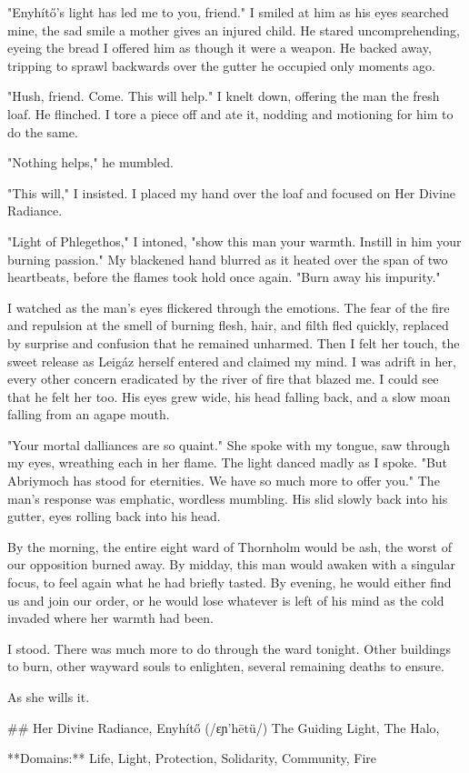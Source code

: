 "Enyhítő's light has led me to you, friend."
 I smiled at him as his eyes searched mine, the sad smile a mother gives an injured child.
 He stared uncomprehending, eyeing the bread I offered him as though it were a weapon.
 He backed away, tripping to sprawl backwards over the gutter he occupied only moments ago.

"Hush, friend.
 Come.
 This will help."
 I knelt down, offering the man the fresh loaf.
 He flinched.
 I tore a piece off and ate it, nodding and motioning for him to do the same.

"Nothing helps," he mumbled.

"This will," I insisted.
 I placed my hand over the loaf and focused on Her Divine Radiance.



"Light of Phlegethos," I intoned, "show this man your warmth.
 Instill in him your burning passion."
 My blackened hand blurred as it heated over the span of two heartbeats,
  before the flames took hold once again.
 "Burn away his impurity."

 I watched as the man's eyes flickered through the emotions.
 The fear of the fire and repulsion at the smell of burning flesh, hair, and filth fled quickly,
  replaced by surprise and confusion that he remained unharmed.
 Then I felt her touch, the sweet release as Leigáz herself entered and claimed my mind.
 I was adrift in her, every other concern eradicated by the river of fire that blazed me.
 I could see that he felt her too.
 His eyes grew wide, his head falling back, and a slow moan falling from an agape mouth.

"Your mortal dalliances are so quaint."
 She spoke with my tongue, saw through my eyes, wreathing each in her flame.
 The light danced madly as I spoke.
"But Abriymoch has stood for eternities.
 We have so much more to offer you."
 The man's response was emphatic, wordless mumbling.
 His slid slowly back into his gutter, eyes rolling back into his head.

By the morning, the entire eight ward of Thornholm would be ash, the worst of our opposition burned away.
By midday, this man would awaken with a singular focus, to feel again what he had briefly tasted.
By evening, he would either find us and join our order,
 or he would lose whatever is left of his mind as the cold invaded where her warmth had been.

I stood.
There was much more to do through the ward tonight.
Other buildings to burn, other wayward souls to enlighten, several remaining deaths to ensure.

As she wills it.


## Her Divine Radiance, Enyhítő (/ɛɲ'hētü/)
The Guiding Light, The Halo,

**Domains:** Life, Light, Protection, Solidarity, Community, Fire

